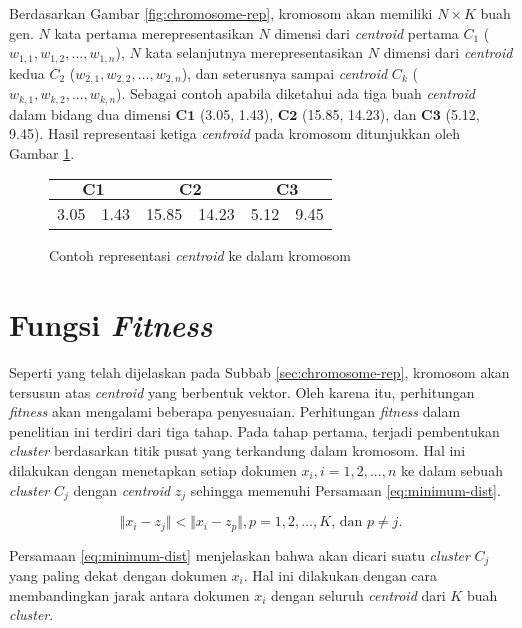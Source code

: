 Berdasarkan Gambar \ref{fig:chromosome-rep}, kromosom akan memiliki $N\times K$ buah gen. $N$ kata pertama merepresentasikan $N$ dimensi dari \textit{centroid} pertama $C_1$ ($w_{1,1}, w_{1,2}, ..., w_{1,n}$), $N$ kata selanjutnya merepresentasikan $N$ dimensi dari \textit{centroid} kedua $C_2$ ($w_{2,1}, w_{2,2}, ..., w_{2,n}$), dan seterusnya sampai \textit{centroid} $C_k$ ($w_{k,1}, w_{k,2}, ..., w_{k,n}$). Sebagai contoh apabila diketahui ada tiga buah \textit{centroid} dalam bidang dua dimensi $\mathbf{C1}$ (3.05, 1.43), $\mathbf{C2}$ (15.85, 14.23), dan $\mathbf{C3}$ (5.12, 9.45). Hasil representasi ketiga \textit{centroid} pada kromosom ditunjukkan oleh Gambar \ref{fig:chromosome}.

\begin{figure}[H]
	\centering
	\begin{tabular}{|c|c|c|c|c|c|}
		\multicolumn{2}{c}{\textbf{$\mathbf{C1}$}} & \multicolumn{2}{c}{\textbf{$\mathbf{C2}$}} & \multicolumn{2}{c}{$\mathbf{C3}$}\\ \hline
		3.05 & 1.43 & 15.85 & 14.23 & 5.12 & 9.45\\ \hline
	\end{tabular}
	\caption{Contoh representasi \textit{centroid} ke dalam kromosom}
	\label{fig:chromosome}
\end{figure}

\section{Fungsi \textit{Fitness}}
\label{sec:func-fitness-analysis}
Seperti yang telah dijelaskan pada Subbab \ref{sec:chromosome-rep}, kromosom akan tersusun atas \textit{centroid} yang berbentuk vektor. Oleh karena itu, perhitungan \textit{fitness} akan mengalami beberapa penyesuaian. Perhitungan \textit{fitness} dalam penelitian ini terdiri dari tiga tahap. Pada tahap pertama, terjadi pembentukan \textit{cluster} berdasarkan titik pusat yang terkandung dalam kromosom. Hal ini dilakukan dengan menetapkan setiap dokumen $x_i,i=1,2, ... ,n$ ke dalam sebuah \textit{cluster} $C_j$ dengan \textit{centroid} $z_j$ sehingga memenuhi Persamaan \ref{eq:minimum-dist}.

\begin{equation}
\label{eq:minimum-dist}
\Vert x_i-z_j \Vert < \Vert x_i-z_p \Vert , p=1,2, ... ,K \mbox{, dan } p \neq j.
\end{equation}

Persamaan \ref{eq:minimum-dist} menjelaskan bahwa akan dicari suatu \textit{cluster} $C_j$ yang paling dekat dengan dokumen $x_i$. Hal ini dilakukan dengan cara membandingkan jarak antara dokumen $x_i$ dengan seluruh \textit{centroid} dari $K$ buah \textit{cluster}. 

